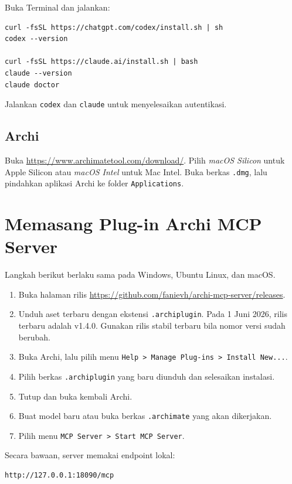 Buka Terminal dan jalankan:

\begin{lstlisting}
curl -fsSL https://chatgpt.com/codex/install.sh | sh
codex --version

curl -fsSL https://claude.ai/install.sh | bash
claude --version
claude doctor
\end{lstlisting}

Jalankan \texttt{codex} dan \texttt{claude} untuk menyelesaikan autentikasi.

\subsection{Archi}

Buka \url{https://www.archimatetool.com/download/}. Pilih \emph{macOS Silicon}
untuk Apple Silicon atau \emph{macOS Intel} untuk Mac Intel. Buka berkas
\texttt{.dmg}, lalu pindahkan aplikasi Archi ke folder \texttt{Applications}.

\section{Memasang Plug-in Archi MCP Server}

Langkah berikut berlaku sama pada Windows, Ubuntu Linux, dan macOS.

\begin{enumerate}
  \item Buka halaman rilis
        \url{https://github.com/fanievh/archi-mcp-server/releases}.
  \item Unduh aset terbaru dengan ekstensi \texttt{.archiplugin}. Pada 1 Juni
        2026, rilis terbaru adalah v1.4.0. Gunakan rilis stabil terbaru bila
        nomor versi sudah berubah.
  \item Buka Archi, lalu pilih menu \texttt{Help > Manage Plug-ins > Install
        New...}.
  \item Pilih berkas \texttt{.archiplugin} yang baru diunduh dan selesaikan
        instalasi.
  \item Tutup dan buka kembali Archi.
  \item Buat model baru atau buka berkas \texttt{.archimate} yang akan
        dikerjakan.
  \item Pilih menu \texttt{MCP Server > Start MCP Server}.
\end{enumerate}

Secara bawaan, server memakai endpoint lokal:

\begin{lstlisting}
http://127.0.0.1:18090/mcp
\end{lstlisting}

